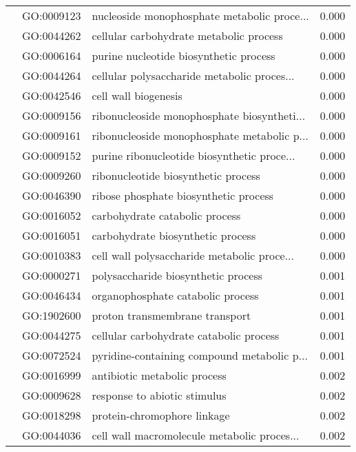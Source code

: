 \begin{longtable}{lllr}
   & GO:0009123 &  nucleoside monophosphate metabolic proce... &         0.000 \\
   & GO:0044262 &      cellular carbohydrate metabolic process &         0.000 \\
   & GO:0006164 &       purine nucleotide biosynthetic process &         0.000 \\
   & GO:0044264 &  cellular polysaccharide metabolic proces... &         0.000 \\
   & GO:0042546 &                         cell wall biogenesis &         0.000 \\
   & GO:0009156 &  ribonucleoside monophosphate biosyntheti... &         0.000 \\
   & GO:0009161 &  ribonucleoside monophosphate metabolic p... &         0.000 \\
   & GO:0009152 &  purine ribonucleotide biosynthetic proce... &         0.000 \\
   & GO:0009260 &          ribonucleotide biosynthetic process &         0.000 \\
   & GO:0046390 &        ribose phosphate biosynthetic process &         0.000 \\
   & GO:0016052 &               carbohydrate catabolic process &         0.000 \\
   & GO:0016051 &            carbohydrate biosynthetic process &         0.000 \\
   & GO:0010383 &  cell wall polysaccharide metabolic proce... &         0.000 \\
   & GO:0000271 &          polysaccharide biosynthetic process &         0.001 \\
   & GO:0046434 &            organophosphate catabolic process &         0.001 \\
   & GO:1902600 &               proton transmembrane transport &         0.001 \\
   & GO:0044275 &      cellular carbohydrate catabolic process &         0.001 \\
   & GO:0072524 &  pyridine-containing compound metabolic p... &         0.001 \\
   & GO:0016999 &                 antibiotic metabolic process &         0.002 \\
   & GO:0009628 &                 response to abiotic stimulus &         0.002 \\
   & GO:0018298 &                  protein-chromophore linkage &         0.002 \\
   & GO:0044036 &  cell wall macromolecule metabolic proces... &         0.002 \\

\end{longtable}
